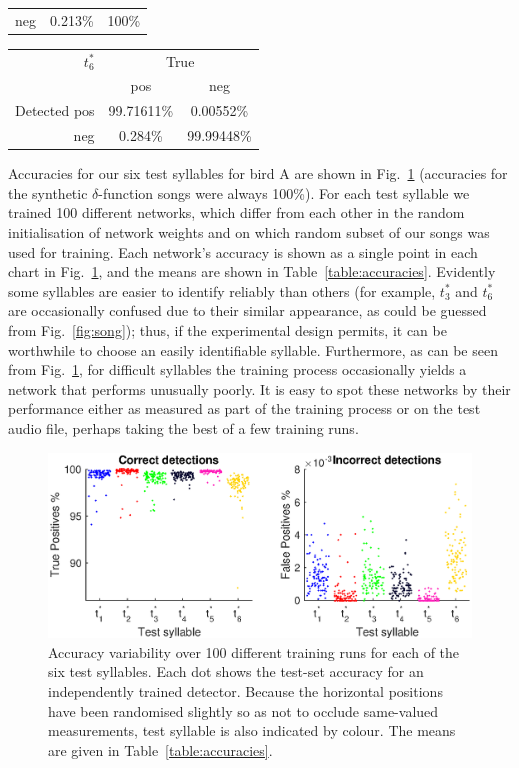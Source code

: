 \documentclass[10pt,letterpaper]{article}
\newcommand\fig[1]{Fig.~\ref{#1}}
\begin{document}
{\begin{tabular}{r|cc}
    neg & 0.213\% & 100\%\\ 
  \end{tabular}
  \vspace{8pt}\par\noindent
  \begin{tabular}{r|cc}
    $t^*_6$ & \multicolumn{2}{c}{True} \\ 
    & pos & neg \\ 
    \hline  Detected pos & 99.71611\% & 0.00552\%\\ 
    neg & 0.284\% & 99.99448\%\\ 
  \end{tabular}
  \vspace{8pt}\par\noindent
}

Accuracies for our six test syllables for bird A are shown in
\fig{fig:accuracies} (accuracies for the synthetic $\delta$-function
songs were always 100\%).  For each test syllable we trained 100
different networks, which differ from each other in the random
initialisation of network weights and on which random subset of our
songs was used for training.  Each network's accuracy is shown as a
single point in each chart in \fig{fig:accuracies}, and the means are
shown in Table~\ref{table:accuracies}.  Evidently some syllables are
easier to identify reliably than others (for example, $t^*_3$ and
$t^*_6$ are occasionally confused due to their similar appearance, as
could be guessed from \fig{fig:song}); thus, if the experimental
design permits, it can be worthwhile to choose an easily identifiable
syllable.  Furthermore, as can be seen from \fig{fig:accuracies}, for
difficult syllables the training process occasionally yields a network
that performs unusually poorly.  It is easy to spot these networks by
their performance either as measured as part of the training process
or on the test audio file, perhaps taking the best of a few training
runs.

\begin{figure}
  \includegraphics[width=\textwidth]{Fig3}
  
  \caption{Accuracy variability over 100 different training runs for
    each of the six test syllables.  Each dot shows the test-set
    accuracy for an independently trained detector.  Because the
    horizontal positions have been randomised slightly so as not to
    occlude same-valued measurements, test syllable is also indicated
    by colour.  The means are given in Table~\ref{table:accuracies}.}
  \label{fig:accuracies}
\end{figure}
\end{document}
